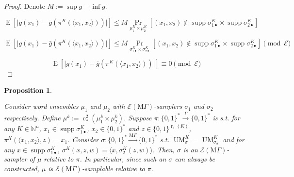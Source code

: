 \documentclass{article}
\numberwithin{equation}{section}
\theoremstyle{definition}
\theoremstyle{plain}
\newtheorem{proposition}{Proposition}[section]
\newcommand{\Bool}{\{0,1\}}
\newcommand{\Words}{{\Bool^*}}
\DeclareMathOperator{\Supp}{supp}
\DeclareMathOperator{\Prb}{Pr}
\DeclareMathOperator{\E}{E}
\DeclareMathOperator{\R}{r}
\DeclareMathOperator{\UM}{UM}
\DeclareMathOperator{\En}{c}
\newcommand{\Nats}{\mathbb{N}}
\newcommand{\Abs}[1]{\lvert #1 \rvert}
\newcommand{\Chev}[1]{\langle #1 \rangle}
\newcommand{\MGrow}{\mathrm{M}\Gamma}
\newcommand{\Fall}{\mathcal{E}}
\newcommand{\EMG}{\Fall(\MGrow)}
\newcommand{\Scheme}{\xrightarrow{\Gamma}}
\newcommand{\MScheme}{\xrightarrow{\MGrow}}
\begin{document}
\begin{proof}

Denote $M:= \sup g - \inf g$.

$$\E[\Abs{g(x_1)-\bar{g}(\pi^{K}(\Chev{x_1,x_2}))}] \leq M \Prb_{ \mu_1^{K} \times \mu_2^{K}}[(x_1,x_2) \not\in \Supp \sigma_{1\bullet}^{K} \times \Supp \sigma_{2\bullet}^{K}]$$

$$\E[\Abs{g(x_1)-\bar{g}(\pi^{K}(\Chev{x_1,x_2}))}] \leq M\Prb_{ \sigma_{1\bullet}^{K} \times \sigma_{2\bullet}^{K}}[(x_1,x_2) \not\in \Supp \sigma_{1\bullet}^{K} \times \Supp \sigma_{2\bullet}^{K}] \pmod \Fall$$

$$\E[\Abs{g(x_1)-\bar{g}(\pi^{K}(\Chev{x_1,x_2}))}] \equiv 0 \pmod \Fall$$
\end{proof}
\begin{samepage}
\begin{proposition}
\label{prp:smp_base_change}

Consider word ensembles $\mu_1$ and $\mu_2$ with $\EMG$-samplers $\sigma_1$ and $\sigma_2$ respectively. Define ${\mu^k:=\En_*^2(\mu_1^k \times \mu_2^k)}$. Suppose ${\pi: \Words \Scheme \Words}$ is s.t. for any $K \in \Nats^n$, ${x_1 \in \Supp \sigma_{1\bullet}^{K}}$, ${x_2 \in \Words}$ and $z \in \Bool^{\R_\pi(K)}$, ${\pi^{K}(\Chev{x_1,x_2},z)=x_1}$. Consider ${\sigma: \Words \MScheme \Words}$ s.t. $\UM_\sigma^{K}=\UM_{\sigma_2}^{K}$ and for any $x \in \Supp \sigma_{1\bullet}^{K}$, ${\sigma^{K}(x,z,w)=\Chev{x,\sigma_2^{K}(z,w)}}$. Then, $\sigma$ is an $\EMG$-sampler of $\mu$ relative to $\pi$. In particular, since such an $\sigma$ can always be constructed, $\mu$ is $\EMG$-samplable relative to $\pi$.

\end{proposition}
\end{samepage}
\end{document}
